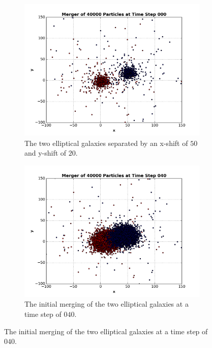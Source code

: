 \documentclass[12pt]{report}
\begin{document}
\begin{figure}[H]
        \centering
        \begin{subfigure}[b]{0.48\textwidth}
            \centering
            \includegraphics[width=\linewidth]{mergert000.png}
            \caption[]%
            {{\small The two elliptical galaxies separated by an x-shift of $50$ and y-shift of $20$.}}    
            \label{fig:merger1_t00}
        \end{subfigure}
        \hfill
        \begin{subfigure}[b]{0.48\textwidth}  
            \centering 
            \includegraphics[width=\linewidth]{mergert040.png}
            \caption[]%
            {{\small The initial merging of the two elliptical galaxies at a time step of $040$.}}    

\end{subfigure}
\end{figure}
\end{document}
